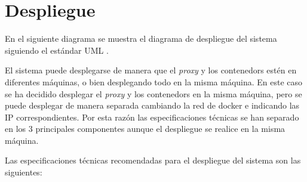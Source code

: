 \section{Despliegue} \label{sec:despliegue}

En el siguiente diagrama  se muestra el diagrama de despliegue del sistema siguiendo el estándar UML \cite{Cook2017}.



El sistema puede desplegarse de manera que el \textit{\gls{proxy}} y los \glspl{contenedor} estén en diferentes máquinas, o bien desplegando todo en la misma máquina. En este caso se ha decidido desplegar el \textit{\gls{proxy}} y los \glspl{contenedor} en la misma máquina, pero se puede desplegar de manera separada cambiando la red de docker e indicando las IP correspondientes. Por esta razón las especificaciones técnicas se han separado en los 3 principales componentes aunque el despliegue se realice en la misma máquina.

Las especificaciones técnicas recomendadas para el despliegue del sistema son las siguientes:

